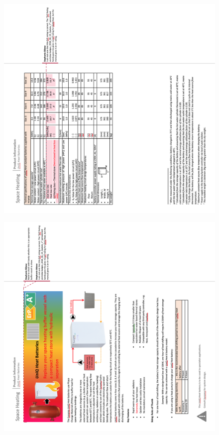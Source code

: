 \newpage
\begin{figure}
	\centering
	\includegraphics[height=0.48\textheight]{Appendices/4_PIS_Heat_02M.png}
	\label{app:heatPIS}
\end{figure}

\begin{figure}
	\centering
	\includegraphics[height=0.48\textheight]{Appendices/4_PIS_Heat_01M.png}
\end{figure}



